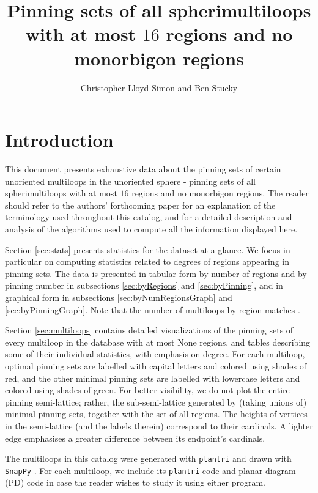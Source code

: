 \documentclass{article}%
\title{Pinning sets of all spherimultiloops with at most $16$ regions and no monorbigon regions}
\author{Christopher-Lloyd Simon and Ben Stucky}
\begin{document}
%

\maketitle

\section{Introduction}
This document presents exhaustive data about the pinning sets of certain unoriented multiloops in the unoriented sphere - pinning sets of all spherimultiloops with at most $16$ regions and no monorbigon regions. The reader should refer to the authors' forthcoming paper \cite{Simon_Stucky_pintheloop_24} for an explanation of the terminology used throughout this catalog, and for a detailed description and analysis of the algorithms used to compute all the information displayed here.

Section \ref{sec:stats} presents statistics for the dataset at a glance. We focus in particular on computing statistics related to degrees of regions appearing in pinning sets. The data is presented in tabular form by number of regions and by pinning number in subsections \ref{sec:byRegions} and \ref{sec:byPinning}, and in graphical form in subsections \ref{sec:byNumRegionsGraph} and \ref{sec:byPinningGraph}. Note that the number of multiloops by region matches \cite[A078666]{oeis}. 

Section \ref{sec:multiloops} contains detailed visualizations of the pinning sets of every multiloop in the database with at most None regions, and tables describing some of their individual statistics, with emphasis on degree. For each multiloop, optimal pinning sets are labelled with capital letters and colored using shades of red, and the other minimal pinning sets are labelled with lowercase letters and colored using shades of green. For better visibility, we do not plot the entire pinning semi-lattice; rather, the sub-semi-lattice generated by (taking unions of) minimal pinning sets, together with the set of all regions. The heights of vertices in the semi-lattice (and the labels therein) correspond to their cardinals. A lighter edge emphasises a greater difference between its endpoint's cardinals.

The multiloops in this catalog were generated with \texttt{plantri} \cite{plantri} and drawn with \texttt{SnapPy} \cite{snappy}. For each multiloop, we include its \texttt{plantri} code and planar diagram (PD) code in case the reader wishes to study it using either program.
\end{document}
